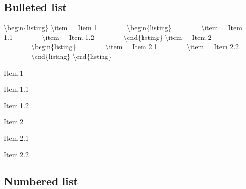 \documentclass[twoside,openany]{thesis}
\begin{document}
\subsection{Bulleted list}\label{subsec:Bulleted list}

{\ttfamily
    \textbackslash begin\{listing\}\linebreak
    \textbackslash item\ \ \ Item 1\linebreak
    \null\ \ \ \ \ \ \ \ \textbackslash begin\{listing\}\linebreak
    \null\ \ \ \ \ \ \ \ \textbackslash item\ \ \ Item 1.1\linebreak
    \null\ \ \ \ \ \ \ \ \textbackslash item\ \ \ Item 1.2\linebreak
    \null\ \ \ \ \ \ \ \ \textbackslash end\{listing\}\linebreak
    \textbackslash item\ \ \ Item 2\linebreak
    \null\ \ \ \ \ \ \ \ \textbackslash begin\{listing\}\linebreak
    \null\ \ \ \ \ \ \ \ \textbackslash item\ \ \ Item 2.1\linebreak
    \null\ \ \ \ \ \ \ \ \textbackslash item\ \ \ Item 2.2\linebreak
    \null\ \ \ \ \ \ \ \ \textbackslash end\{listing\}\linebreak
    \textbackslash end\{listing\}
}

\begin{listing}
\item   Item 1
        \begin{listing}
        \item   Item 1.1
        \item   Item 1.2
        \end{listing}
\item   Item 2
        \begin{listing}
        \item   Item 2.1
        \item   Item 2.2
        \end{listing}
\end{listing}

\subsection{Numbered list}\label{subsec:Numbered list}
\end{document}
